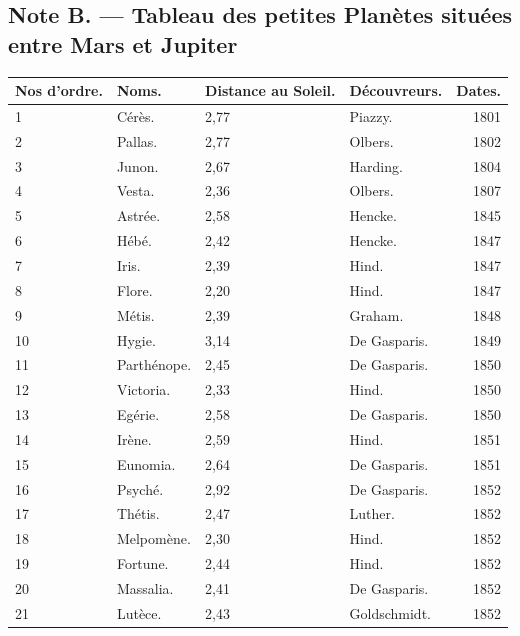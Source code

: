 \documentclass[a4paper, 11pt, oneside, landscape]{article}
\begin{document}
\begin{landscape}
\subsection{Note B. --- Tableau des petites Planètes situées entre Mars et Jupiter}
\begin{center}
    \small
    \bfseries
    \begin{longtable}{|p{10mm}|l|p{10mm}|l|r|}
    \hline
        \textbf{Nos d'ordre.} & \textbf{Noms.} & \textbf{Distance au Soleil.} & \textbf{Découvreurs.} & \textbf{Dates.} \\ \hline
        1 & Cérès. & 2,77 & Piazzy. & 1801 \\ \hline
        2 & Pallas. & 2,77 & Olbers. & 1802 \\ \hline
        3 & Junon. & 2,67 & Harding. & 1804 \\ \hline
        4 & Vesta. & 2,36 & Olbers. & 1807 \\ \hline
        5 & Astrée. & 2,58 & Hencke. & 1845 \\ \hline
        6 & Hébé. & 2,42 & Hencke. & 1847 \\ \hline
        7 & Iris. & 2,39 & Hind. & 1847 \\ \hline
        8 & Flore. & 2,20 & Hind. & 1847 \\ \hline
        9 & Métis. & 2,39 & Graham. & 1848 \\ \hline
        10 & Hygie. & 3,14 & De Gasparis. & 1849 \\ \hline
        11 & Parthénope. & 2,45 & De Gasparis. & 1850 \\ \hline
        12 & Victoria. & 2,33 & Hind. & 1850 \\ \hline
        13 & Egérie. & 2,58 & De Gasparis. & 1850 \\ \hline
        14 & Irène. & 2,59 & Hind. & 1851 \\ \hline
        15 & Eunomia. & 2,64 & De Gasparis. & 1851 \\ \hline
        16 & Psyché. & 2,92 & De Gasparis. & 1852 \\ \hline
        17 & Thétis. & 2,47 & Luther. & 1852 \\ \hline
        18 & Melpomène. & 2,30 & Hind. & 1852 \\ \hline
        19 & Fortune. & 2,44 & Hind. & 1852 \\ \hline
        20 & Massalia. & 2,41 & De Gasparis. & 1852 \\ \hline
        21 & Lutèce. & 2,43 & Goldschmidt. & 1852 \\ \hline

\end{longtable}
\end{center}
\end{landscape}
\end{document}
